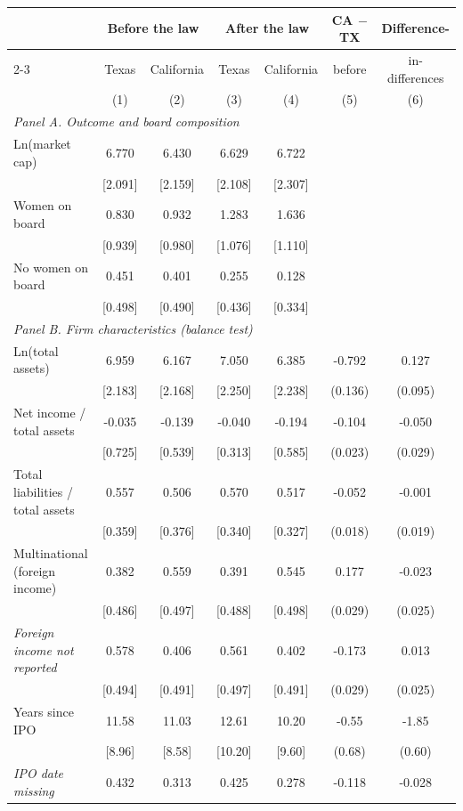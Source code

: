\begin{tabular}{lcccccc}
\hline\hline
 & \multicolumn{2}{c}{Before the law} & \multicolumn{2}{c}{After the law} & CA $-$ TX & Difference- \\
\cline{2-3} \cline{4-5}
 & Texas & California & Texas & California & before & in-differences \\
 & (1) & (2) & (3) & (4) & (5) & (6) \\
\hline
\multicolumn{7}{l}{\textit{Panel A. Outcome and board composition}} \\
Ln(market cap) & 6.770 & 6.430 & 6.629 & 6.722 &  &  \\
 & [2.091] & [2.159] & [2.108] & [2.307] &  &  \\
Women on board & 0.830 & 0.932 & 1.283 & 1.636 &  &  \\
 & [0.939] & [0.980] & [1.076] & [1.110] &  &  \\
No women on board & 0.451 & 0.401 & 0.255 & 0.128 &  &  \\
 & [0.498] & [0.490] & [0.436] & [0.334] &  &  \\
\multicolumn{7}{l}{\textit{Panel B. Firm characteristics (balance test)}} \\
Ln(total assets) & 6.959 & 6.167 & 7.050 & 6.385 & -0.792 & 0.127 \\
 & [2.183] & [2.168] & [2.250] & [2.238] & (0.136) & (0.095) \\
Net income / total assets & -0.035 & -0.139 & -0.040 & -0.194 & -0.104 & -0.050 \\
 & [0.725] & [0.539] & [0.313] & [0.585] & (0.023) & (0.029) \\
Total liabilities / total assets & 0.557 & 0.506 & 0.570 & 0.517 & -0.052 & -0.001 \\
 & [0.359] & [0.376] & [0.340] & [0.327] & (0.018) & (0.019) \\
Multinational (foreign income) & 0.382 & 0.559 & 0.391 & 0.545 & 0.177 & -0.023 \\
 & [0.486] & [0.497] & [0.488] & [0.498] & (0.029) & (0.025) \\
\quad \textit{Foreign income not reported} & 0.578 & 0.406 & 0.561 & 0.402 & -0.173 & 0.013 \\
 & [0.494] & [0.491] & [0.497] & [0.491] & (0.029) & (0.025) \\
Years since IPO & 11.58 & 11.03 & 12.61 & 10.20 & -0.55 & -1.85 \\
 & [8.96] & [8.58] & [10.20] & [9.60] & (0.68) & (0.60) \\
\quad \textit{IPO date missing} & 0.432 & 0.313 & 0.425 & 0.278 & -0.118 & -0.028 \\

\end{tabular}
